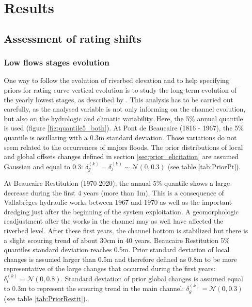 \documentclass[11pt]{article}
\begin{document}
 \section{Results}
 
    \subsection{Assessment of rating shifts}
    
    \subsubsection{Low flows stages evolution}
    \label{sec:stageevolution}
    
    One way to follow the evolution of riverbed elevation and to help specifying priors for rating curve vertical evolution is to study the long-term evolution of the yearly lowest stages, as described by \citet{lapuszek_methods_2015}. This analysis has to be carried out carefully, as the analysed variable is not only informing on the channel evolution, but also on the hydrologic and climatic variability. Here, the 5\% annual quantile is used (figure  \ref{fig:quantile5_both}). At Pont de Beaucaire (1816 - 1967), the 5\% quantile is oscillating with a 0.3m standard deviation. Those variations do not seem related to the occurrences of majors floods. The prior distributions of local and global offsets changes defined in section \ref{sec:prior_elicitation} are assumed Gaussian and equal to 0.3: $\delta_g^{(k)} = \delta_l^{(k)} \sim \mathcal{N}(0,0.3)$ (see table \ref{tab:PriorPt}).
    
    At Beaucaire Restitution (1970-2020), the annual 5\% quantile shows a large decrease during the first 4 years (more than 1m). This is a consequence of Vallabrèges hydraulic works between 1967 and 1970 as well as the important dredging just after the beginning of the system exploitation. A geomorphologic readjustment after the works in the channel may as well have affected the riverbed level. After these first years, the channel bottom is stabilized but there is a slight scouring trend of about 30cm in 40 years. Beaucaire Restitution 5\% quantiles standard deviation reaches 0.5m. Prior standard deviation of local changes is assumed larger than 0.5m and therefore defined as 0.8m to be more representative of the large changes that occurred during the first years: $\delta_l^(k) = \mathcal{N}(0,0.8)$. Standard deviation of prior global changes is assumed equal to 0.3m to represent the scouring trend in the main channel: $\delta_g^{(k)} = \mathcal{N}(0,0.3)$ (see table \ref{tab:PriorRestit}).
    
\end{document}
